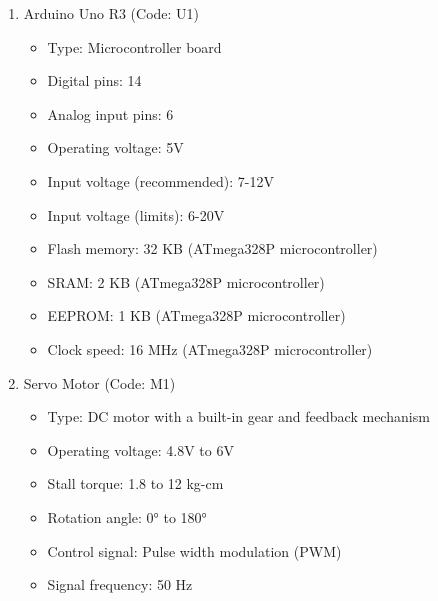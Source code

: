 \documentclass[11pt]{article}
\begin{document}
\begin{enumerate}
	\item Arduino Uno R3 (Code: U1)
	      \begin{itemize}
		      \item Type: Microcontroller board
		      \item Digital pins: 14
		      \item Analog input pins: 6
		      \item Operating voltage: 5V
		      \item Input voltage (recommended): 7-12V
		      \item Input voltage (limits): 6-20V
		      \item Flash memory: 32 KB (ATmega328P microcontroller)
		      \item SRAM: 2 KB (ATmega328P microcontroller)
		      \item EEPROM: 1 KB (ATmega328P microcontroller)
		      \item Clock speed: 16 MHz (ATmega328P microcontroller)
	      \end{itemize}
	\item Servo Motor (Code: M1)
	      \begin{itemize}
		      \item Type: DC motor with a built-in gear and feedback mechanism
		      \item Operating voltage: 4.8V to 6V
		      \item Stall torque: 1.8 to 12 kg-cm
		      \item Rotation angle: 0° to 180°
		      \item Control signal: Pulse width modulation (PWM)
		      \item Signal frequency: 50 Hz
	      \end{itemize}

\end{enumerate}
\end{document}

